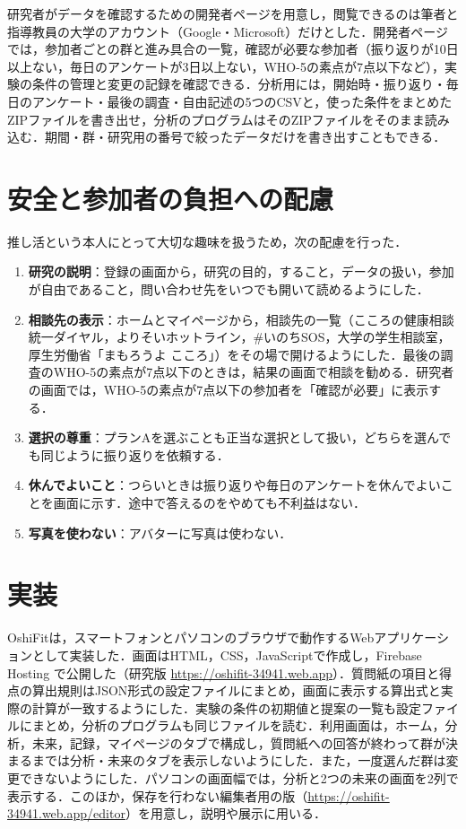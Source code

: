 研究者がデータを確認するための開発者ページを用意し，閲覧できるのは筆者と指導教員の大学のアカウント（Google・Microsoft）だけとした．開発者ページでは，参加者ごとの群と進み具合の一覧，確認が必要な参加者（振り返りが10日以上ない，毎日のアンケートが3日以上ない，WHO-5の素点が7点以下など），実験の条件の管理と変更の記録を確認できる．分析用には，開始時・振り返り・毎日のアンケート・最後の調査・自由記述の5つのCSVと，使った条件をまとめたZIPファイルを書き出せ，分析のプログラムはそのZIPファイルをそのまま読み込む．期間・群・研究用の番号で絞ったデータだけを書き出すこともできる．

\section{安全と参加者の負担への配慮}\label{sec:safety}
推し活という本人にとって大切な趣味を扱うため，次の配慮を行った．
\begin{enumerate}
\item \textbf{研究の説明}：登録の画面から，研究の目的，すること，データの扱い，参加が自由であること，問い合わせ先をいつでも開いて読めるようにした．
\item \textbf{相談先の表示}：ホームとマイページから，相談先の一覧（こころの健康相談統一ダイヤル，よりそいホットライン，\#いのちSOS，大学の学生相談室，厚生労働省「まもろうよ こころ」）をその場で開けるようにした．最後の調査のWHO-5の素点が7点以下のときは，結果の画面で相談を勧める．研究者の画面では，WHO-5の素点が7点以下の参加者を「確認が必要」に表示する．
\item \textbf{選択の尊重}：プランAを選ぶことも正当な選択として扱い，どちらを選んでも同じように振り返りを依頼する．
\item \textbf{休んでよいこと}：つらいときは振り返りや毎日のアンケートを休んでよいことを画面に示す．途中で答えるのをやめても不利益はない．
\item \textbf{写真を使わない}：アバターに写真は使わない．
\end{enumerate}

\section{実装}
OshiFitは，スマートフォンとパソコンのブラウザで動作するWebアプリケーションとして実装した．画面はHTML，CSS，JavaScriptで作成し，Firebase Hosting で公開した（研究版 \url{https://oshifit-34941.web.app}）．質問紙の項目と得点の算出規則はJSON形式の設定ファイルにまとめ，画面に表示する算出式と実際の計算が一致するようにした．実験の条件の初期値と提案の一覧も設定ファイルにまとめ，分析のプログラムも同じファイルを読む．利用画面は，ホーム，分析，未来，記録，マイページのタブで構成し，質問紙への回答が終わって群が決まるまでは分析・未来のタブを表示しないようにした．また，一度選んだ群は変更できないようにした．パソコンの画面幅では，分析と2つの未来の画面を2列で表示する．このほか，保存を行わない編集者用の版（\url{https://oshifit-34941.web.app/editor}）を用意し，説明や展示に用いる．


